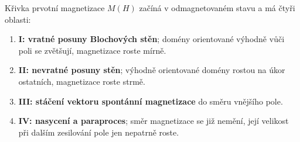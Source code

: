 Křivka prvotní magnetizace $M(H)$ začíná v odmagnetovaném stavu a má čtyři oblasti:
\begin{enumerate}
\item \textbf{I: vratné posuny Blochových stěn}; domény orientované výhodně vůči poli se zvětšují, magnetizace roste mírně.
\item \textbf{II: nevratné posuny stěn}; výhodně orientované domény rostou na úkor ostatních, magnetizace roste strmě.
\item \textbf{III: stáčení vektoru spontánní magnetizace} do směru vnějšího pole.
\item \textbf{IV: nasycení a paraproces}; směr magnetizace se již nemění, její velikost při dalším zesilování pole jen nepatrně roste.
\end{enumerate}
